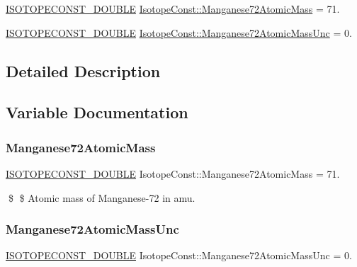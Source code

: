 \begin{DoxyCompactItemize}
\item 
\mbox{\hyperlink{group___isotope_const-_macros_ga8f45a7272ce02c0b4c65c44636ed719a}{I\+S\+O\+T\+O\+P\+E\+C\+O\+N\+S\+T\+\_\+\+D\+O\+U\+B\+LE}} \mbox{\hyperlink{group___isotope_const-_manganese-_mn72_ga5b61c57175cad784dead440ef2ba5c54}{Isotope\+Const\+::\+Manganese72\+Atomic\+Mass}} = 71.
\item 
\mbox{\hyperlink{group___isotope_const-_macros_ga8f45a7272ce02c0b4c65c44636ed719a}{I\+S\+O\+T\+O\+P\+E\+C\+O\+N\+S\+T\+\_\+\+D\+O\+U\+B\+LE}} \mbox{\hyperlink{group___isotope_const-_manganese-_mn72_ga798df070b44baeff50f578ec6df7bde4}{Isotope\+Const\+::\+Manganese72\+Atomic\+Mass\+Unc}} = 0.
\end{DoxyCompactItemize}


\subsection{Detailed Description}


\subsection{Variable Documentation}
\mbox{\label{group___isotope_const-_manganese-_mn72_ga5b61c57175cad784dead440ef2ba5c54}} 
\subsubsection{\texorpdfstring{Manganese72\+Atomic\+Mass}{Manganese72AtomicMass}}
{\footnotesize\ttfamily \mbox{\hyperlink{group___isotope_const-_macros_ga8f45a7272ce02c0b4c65c44636ed719a}{I\+S\+O\+T\+O\+P\+E\+C\+O\+N\+S\+T\+\_\+\+D\+O\+U\+B\+LE}} Isotope\+Const\+::\+Manganese72\+Atomic\+Mass = 71.}

\$ \$ Atomic mass of Manganese-\/72 in amu. \mbox{\label{group___isotope_const-_manganese-_mn72_ga798df070b44baeff50f578ec6df7bde4}} 
\subsubsection{\texorpdfstring{Manganese72\+Atomic\+Mass\+Unc}{Manganese72AtomicMassUnc}}
{\footnotesize\ttfamily \mbox{\hyperlink{group___isotope_const-_macros_ga8f45a7272ce02c0b4c65c44636ed719a}{I\+S\+O\+T\+O\+P\+E\+C\+O\+N\+S\+T\+\_\+\+D\+O\+U\+B\+LE}} Isotope\+Const\+::\+Manganese72\+Atomic\+Mass\+Unc = 0.}

